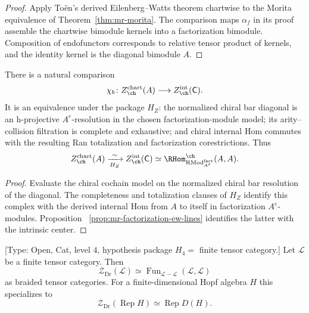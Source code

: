 \begin{proof}
Apply To\"en's derived Eilenberg--Watts theorem chartwise to the Morita
equivalence of Theorem~\ref{thm:mr-morita}.  The comparison maps
$\alpha_f$ in its proof assemble the chartwise bimodule kernels into a
factorization bimodule.  Composition of endofunctors corresponds to
relative tensor product of kernels, and the identity kernel is the
diagonal bimodule $A$.
\end{proof}

\begin{proposition}
\label{prop:mr-pointed-brane-center}
There is a natural comparison
\[
 \chi_b\colon
 Z_{\ch}^{\mathrm{chart}}(A)
 \longrightarrow
 Z_{\ch}^{\mathrm{int}}(\mathsf C).
\]
It is an equivalence under the package $H_Z$: the normalized chiral
bar diagonal is an h-projective $A^e$-resolution in the chosen
factorization-module model; its arity--collision filtration is
complete and exhaustive; and chiral internal Hom commutes with the
resulting Ran totalization and factorization corestrictions.  Thus
\[
 Z_{\ch}^{\mathrm{chart}}(A)
 \xrightarrow[H_Z]{\ \sim\ }
 Z_{\ch}^{\mathrm{int}}(\mathsf C)
 \simeq
 \RHom^{\ch}_{\mathrm{RMod}^{\fact}_{A^e}}(A,A).
\]
\end{proposition}

\begin{proof}
Evaluate the chiral cochain model on the normalized chiral bar
resolution of the diagonal.  The completeness and totalization
clauses of $H_Z$ identify this complex with the derived internal Hom
from $A$ to itself in factorization $A^e$-modules.  Proposition~
\ref{prop:mr-factorization-ew-lines} identifies the latter with the
intrinsic center.
\end{proof}

\begin{theorem}
\label{thm:mr-drinfeld-double}
\textup{[Type: Open, Cat, level $4$, hypothesis package
$H_4=$ finite tensor category.]}
Let $\mathcal L$ be a finite tensor category.  Then
\[
 \mathcal Z_{\mathrm{Dr}}(\mathcal L)
 \simeq
 \operatorname{Fun}_{\mathcal L-\mathcal L}(\mathcal L,\mathcal L)
\]
as braided tensor categories.  For a finite-dimensional Hopf algebra
$H$ this specializes to
\[
 \mathcal Z_{\mathrm{Dr}}(\operatorname{Rep}H)
 \simeq \operatorname{Rep}D(H).
\]
\end{theorem}

